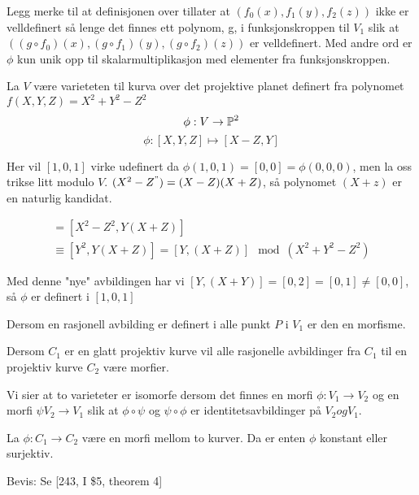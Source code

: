 Legg merke til at definisjonen over tillater at $(f_0(x), f_1(y), f_2(z))$ ikke er velldefinert så lenge det finnes ett polynom, g,  i funksjonskroppen til $V_1$ slik at $((g \circ f_0)(x), (g \circ f_1)(y), (g \circ f_2)(z))$ er velldefinert. Med andre ord er $\phi$ kun unik opp til skalarmultiplikasjon med elementer fra funksjonskroppen.

\begin{eksempel} La $V$ være varieteten til kurva over det projektive planet definert fra polynomet $f(X, Y, Z) = X^2 + Y^2 - Z^2$
$$\phi: V \rightarrow \mathbb{P}^2$$
$$\phi: [X, Y, Z] \mapsto [X-Z, Y]$$

Her vil $[1, 0, 1]$ virke udefinert da $\phi(1,0,1) = [0,0] = \phi(0,0,0)$, men la oss trikse litt modulo $V$. $(X^2 - Z^") = (X-Z)(X+Z)$, så polynomet $(X+z)$ er en naturlig kandidat.

\begin{align*}
    [(X-Z)(X+Z), Y(X-Z)] = [X^2 - Z^2, Y(X+Z)] \\
\equiv [Y^2, Y(X+Z)] = [Y, (X+Z)] \mod{(X^2+Y^2-Z^2)}
\end{align*}

Med denne "nye" avbildingen har vi $[Y, (X+Y)] = [0,2] = [0,1] \neq [0,0] $, så $\phi$ er definert i $[1,0,1]$
\end{eksempel}


\begin{definisjon}
Dersom en rasjonell avbilding er definert i alle punkt $P$ i $V_1$ er den en morfisme.
\end{definisjon}

\begin{teorem}
Dersom $C_1$ er en glatt projektiv kurve vil alle rasjonelle avbildinger fra $C_1$ til en projektiv kurve $C_2$ være morfier.
\end{teorem}

\begin{definisjon}
Vi sier at to varieteter er isomorfe dersom det finnes en morfi $\phi: V_1 \rightarrow V_2$ og en morfi $\psi V_2 \rightarrow V_1$ slik at $\phi \circ \psi$ og $\psi \circ \phi$ er identitetsavbildinger på $V_2 og V_1$. 
\end{definisjon}


\begin{teorem}
\label{morfi konstant eller surjektiv}
La $\phi: C_1 \rightarrow C_2$ være en morfi mellom to kurver. Da er enten $\phi$ konstant eller surjektiv.

Bevis:
Se [243, I \$5, theorem 4]
\end{teorem}